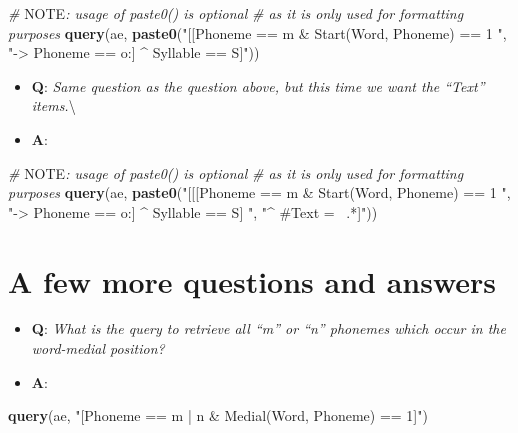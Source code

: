 \documentclass[]{book}
\newenvironment{Shaded}{\begin{snugshade}}{\end{snugshade}}
\newcommand{\AlertTok}[1]{\textcolor[rgb]{0.94,0.16,0.16}{#1}}
\newcommand{\CommentTok}[1]{\textcolor[rgb]{0.56,0.35,0.01}{\textit{#1}}}
\newcommand{\KeywordTok}[1]{\textcolor[rgb]{0.13,0.29,0.53}{\textbf{#1}}}
\newcommand{\NormalTok}[1]{#1}
\newcommand{\StringTok}[1]{\textcolor[rgb]{0.31,0.60,0.02}{#1}}
\providecommand{\tightlist}{%
  \setlength{\itemsep}{0pt}\setlength{\parskip}{0pt}}
\theoremstyle{definition}
\theoremstyle{definition}
\theoremstyle{definition}
\theoremstyle{remark}
\begin{document}
\begin{Shaded}
\begin{Highlighting}[]
\CommentTok{# }\AlertTok{NOTE}\CommentTok{: usage of paste0() is optional}
\CommentTok{# as it is only used for formatting purposes}
\KeywordTok{query}\NormalTok{(ae, }\KeywordTok{paste0}\NormalTok{(}\StringTok{"[[Phoneme == m & Start(Word, Phoneme) == 1 "}\NormalTok{,}
                 \StringTok{"-> Phoneme == o:] ^ Syllable == S]"}\NormalTok{))}
\end{Highlighting}
\end{Shaded}

\begin{itemize}
\tightlist
\item
  \textbf{Q}: \emph{Same question as the question above, but this time
  we want the ``Text'' items.}\textbackslash{}
\item
  \textbf{A}:
\end{itemize}

\begin{Shaded}
\begin{Highlighting}[]
\CommentTok{# }\AlertTok{NOTE}\CommentTok{: usage of paste0() is optional}
\CommentTok{# as it is only used for formatting purposes}
\KeywordTok{query}\NormalTok{(ae, }\KeywordTok{paste0}\NormalTok{(}\StringTok{"[[[Phoneme == m & Start(Word, Phoneme) == 1 "}\NormalTok{,}
                 \StringTok{"-> Phoneme == o:] ^ Syllable == S] "}\NormalTok{,}
                 \StringTok{"^ #Text =~ .*]"}\NormalTok{))}
\end{Highlighting}
\end{Shaded}

\hypertarget{a-few-more-questions-and-answers}{%
\section{A few more questions and
answers}\label{a-few-more-questions-and-answers}}

\begin{itemize}
\tightlist
\item
  \textbf{Q}: \emph{What is the query to retrieve all ``m'' or ``n''
  phonemes which occur in the word-medial position?}
\item
  \textbf{A}:
\end{itemize}

\begin{Shaded}
\begin{Highlighting}[]
\KeywordTok{query}\NormalTok{(ae, }\StringTok{"[Phoneme == m | n & Medial(Word, Phoneme) == 1]"}\NormalTok{)}
\end{Highlighting}
\end{Shaded}
\end{document}

